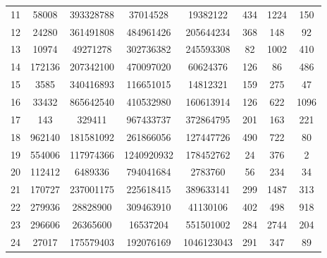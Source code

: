 \documentclass[11pt]{scrartcl}
\theoremstyle{dotlessP}
\theoremstyle{dotlessN}
\theoremstyle{dotN}
\begin{document}
\begin{table}[H]
{\begin{tabular}{c|c|c|c|c|c|c|c}
11            & 58008       & 393328788       & 37014528      & 19382122            & 434                & 1224             & 150                    \\
12            & 24280       & 361491808       & 484961426     & 205644234           & 368                & 148              & 92                     \\
13            & 10974       & 49271278        & 302736382     & 245593308           & 82                 & 1002             & 410                    \\
14            & 172136      & 207342100       & 470097020     & 60624376            & 126                & 86               & 486                    \\
15            & 3585        & 340416893       & 116651015     & 14812321            & 159                & 275              & 47                     \\
16            & 33432       & 865642540       & 410532980     & 160613914           & 126                & 622              & 1096                   \\
17            & 143         & 329411          & 967433737     & 372864795           & 201                & 163              & 221                    \\
18            & 962140      & 181581092       & 261866056     & 127447726           & 490                & 722              & 80                     \\
19            & 554006      & 117974366       & 1240920932    & 178452762           & 24                 & 376              & 2                      \\
20            & 112412      & 6489336         & 794041684     & 2783760             & 56                 & 234              & 34                     \\
21            & 170727      & 237001175       & 225618415     & 389633141           & 299                & 1487             & 313                    \\
22            & 279936      & 28828900        & 309463910     & 41130106            & 402                & 498              & 918                    \\
23            & 296606      & 26365600        & 16537204      & 551501002           & 284                & 2744             & 204                    \\
24            & 27017       & 175579403       & 192076169     & 1046123043          & 291                & 347              & 89                     \\

\end{tabular}}
\end{table}
\end{document}
